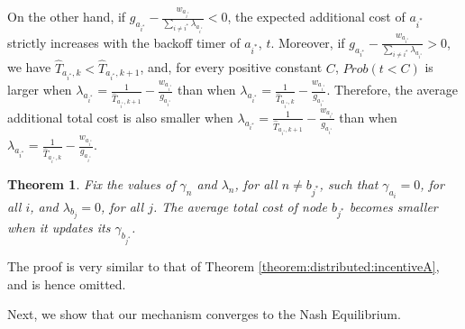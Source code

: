 \documentclass[11pt, conference]{IEEEtran}
\newtheorem{theorem}{Theorem}
\begin{document}
\begin{IEEEproof}
On the other hand, if $g_{a_{i^*}}-\frac{w_{a_{i^*}}}{\sum_{i\neq i^*}\lambda_{a_{i^*}}}<0$, the expected additional cost of $a_{i^*}$ strictly increases with the backoff timer of $a_{i^*}$, $t$. Moreover, if $g_{a_{i^*}}-\frac{w_{a_{i^*}}}{\sum_{i\neq i^*}\lambda_{a_{i^*}}}>0$, we have $\hat{T}_{a_{i^*},k}<\hat{T}_{a_{i^*},k+1}$, and, for every positive constant $C$, $Prob(t<C)$ is larger when $\lambda_{a_{i^*}}=\frac{1}{\hat{T}_{a_{i^*},k+1}}-\frac{w_{a_{i^*}}}{g_{a_{i^*}}}$ than when $\lambda_{a_{i^*}}=\frac{1}{\hat{T}_{a_{i^*},k}}-\frac{w_{a_{i^*}}}{g_{a_{i^*}}}$. Therefore, the average additional total cost is also smaller when $\lambda_{a_{i^*}}=\frac{1}{\hat{T}_{a_{i^*},k+1}}-\frac{w_{a_{i^*}}}{g_{a_{i^*}}}$ than when $\lambda_{a_{i^*}}=\frac{1}{\hat{T}_{a_{i^*},k}}-\frac{w_{a_{i^*}}}{g_{a_{i^*}}}$.
\end{IEEEproof}

\begin{theorem} \label{theorem:distributed:incentiveB}
Fix the values of $\gamma_n$ and $\lambda_n$, for all $n\neq b_{j^*}$, such that $\gamma_{a_i}=0$, for all $i$, and $\lambda_{b_j}=0$, for all $j$. The average total cost of node $b_{j^*}$ becomes smaller when it updates its $\gamma_{b_{j^*}}$.
\end{theorem}
\begin{IEEEproof}
The proof is very similar to that of Theorem \ref{theorem:distributed:incentiveA}, and is hence omitted.
\end{IEEEproof}

Next, we show that our mechanism converges to the Nash Equilibrium.
\end{document}
